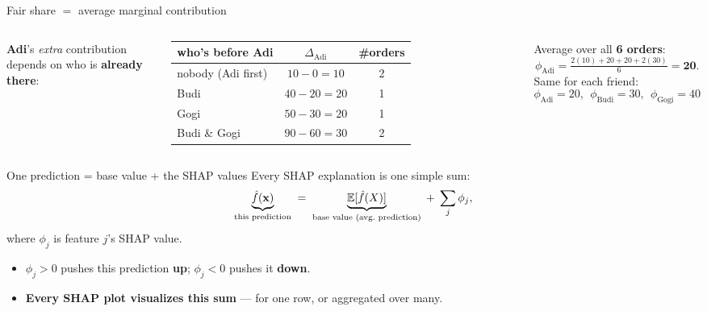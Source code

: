 \documentclass[aspectratio=169]{beamer}
\begin{document}
\begin{frame}{Fair share $=$ average marginal contribution}
  \begin{columns}[T]
    \textbf{Adi}'s \emph{extra} contribution depends on who is \textbf{already there}:
    \vskip 3pt
    {\footnotesize
    \renewcommand{\arraystretch}{1.15}
    \begin{tabular}{l c c}
      who's before Adi & $\Delta_{\text{Adi}}$ & \#orders \\
      \hline
      nobody (Adi first) & $10-0 = 10$ & 2 \\
      Budi & $40-20 = 20$ & 1 \\
      Gogi & $50-30 = 20$ & 1 \\
      Budi \& Gogi & $90-60 = 30$ & 2 \\
      \hline
    \end{tabular}}
    \vskip 4pt
    Average over all \textbf{6 orders}:
    \[ \phi_{\text{Adi}} = \tfrac{2(10)+20+20+2(30)}{6} = \mathbf{20}. \]
    Same for each friend:
    \[ \phi_{\text{Adi}}{=}20,\ \ \phi_{\text{Budi}}{=}30,\ \ \phi_{\text{Gogi}}{=}40 \]
    \vskip 4pt
  \end{columns}
\end{frame}

\begin{frame}{One prediction = base value + the SHAP values}
  Every SHAP explanation is one simple sum:
  \[
    \underbrace{\hat f(\xv)}_{\text{this prediction}} \;=\;
    \underbrace{\mathbb{E}[\hat f(X)]}_{\text{base value (avg.\ prediction)}}
    \;+\; \sum_j \phi_j ,
  \]
  where $\phi_j$ is feature $j$'s SHAP value.
  \begin{itemize}\small
    \item $\phi_j > 0$ pushes this prediction \textbf{up}; $\phi_j < 0$ pushes it \textbf{down}.
    \item \textbf{Every SHAP plot visualizes this sum} --- for one row, or aggregated over many.
  \end{itemize}
\end{frame}
\end{document}
